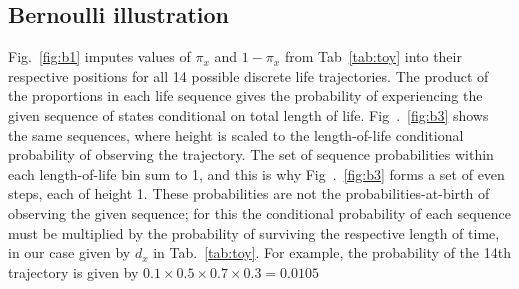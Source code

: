 \documentclass{bmcart}
\begin{document}
\subsection{Bernoulli illustration}
Fig.~\ref{fig:b1} imputes values of $\pi_x$ and $1-\pi_x$ from Tab~\ref{tab:toy} into their respective positions for all 14 possible discrete life trajectories. The product of the proportions in each life sequence
gives the probability of experiencing the given sequence of states conditional on total length of life. Fig~.~\ref{fig:b3} shows the same sequences, where height is scaled to the length-of-life conditional probability of observing the trajectory. The set of sequence probabilities within each length-of-life bin sum to 1, and this is why Fig~.~\ref{fig:b3} forms a set of even steps, each of height 1. These probabilities are not the probabilities-at-birth of observing the given sequence; for this the conditional probability of each sequence must be multiplied by the probability of surviving the respective length of time, in our case given by $d_x$ in Tab.~\ref{tab:toy}. For example, the probability of the 14th trajectory is given by $0.1\times 0.5\times 0.7\times 0.3 = 0.0105$
\end{document}
